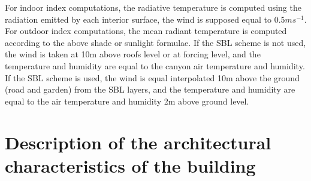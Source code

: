 For indoor index computations, the radiative temperature is computed using the radiation emitted by each interior surface, the wind is supposed equal to 0.5$ms^{-1}$. \\

For outdoor index computations, the mean radiant temperature is computed according to the above shade or sunlight formulae. If the SBL scheme is not used, the wind is taken at 10m above roofs level or at forcing level, and the temperature and humidity are equal to the canyon air temperature and humidity. If the SBL scheme is used, the wind is equal interpolated 10m above the ground (road and garden) from the SBL layers, and the temperature and humidity are equal to the air temperature and humidity 2m above ground level. \\




\clearpage
\section{Description of the architectural characteristics of the building}\label{archi}

